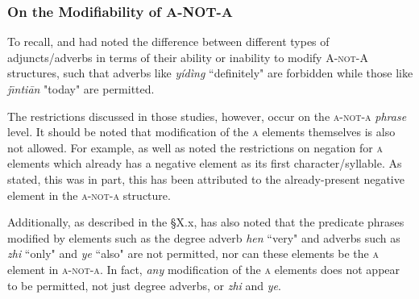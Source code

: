 \documentclass[12pt, UTF8]{article}
\begin{document}
\subsubsection{On the Modifiability of A-NOT-A}


To recall, \cite{Ernst1994} and \cite{Law2006} had noted the difference between different types of adjuncts/adverbs in terms of their ability or inability to modify \textsc{A-not-A} structures, such that adverbs like \textit{y\'{i}d\`{i}ng} ``definitely" are forbidden while those like \textit{j\={\i}nti\={a}n} "today" are permitted.

The restrictions discussed in those studies, however, occur on the \textsc{a-not-a} \textit{phrase} level. It should be noted that modification of the \textsc{a} elements themselves is also not allowed. For example, \cite{McCawley1994} as well as \cite{Liing2014} noted the restrictions on negation for \textsc{a} elements which already has a negative element as its first character/syllable. As stated, this was in part, this has been attributed to the already-present negative element in the \textsc{a-not-a} structure.

Additionally, as described in the \S X.x, \cite{McCawley1994} has also noted that the predicate phrases modified by elements such as the degree adverb \textit{hen} ``very" and adverbs such as \textit{zhi} ``only" and \textit{ye} ``also" are not permitted, nor can these elements be the \textsc{a} element in \textsc{a-not-a}. In fact, \textit{any} modification of the \textsc{a} elements does not appear to be permitted, not just degree adverbs, or \textit{zhi} and \textit{ye}.


%
%

%
%
%
%
\end{document}

